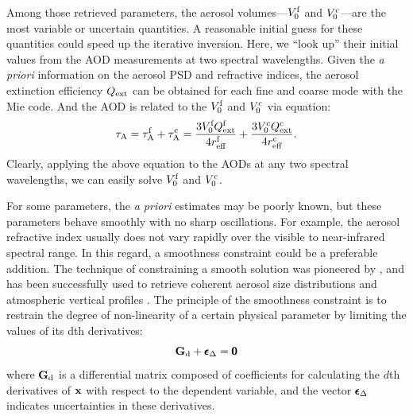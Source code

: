 Among those retrieved parameters, the aerosol volumes---$V_0^\text{f}$ and
$V_0^\text{c}$---are the most variable or uncertain quantities. A reasonable
initial guess for these quantities could speed up the iterative
inversion. Here, we “look up” their initial values from the AOD
measurements at two spectral wavelengths. Given the \textit{a priori}
 information on the aerosol PSD and refractive indices, the aerosol 
extinction efficiency $Q_\text{ext}$ can be obtained for each fine and coarse 
mode with the Mie code. And the AOD is related to the $V_0^\text{f}$ and
$V_0^\text{c}$ via equation:
\begin{equation}
\tau_\text{A} = \tau_\text{A}^\text{f} + \tau_\text{A}^\text{c} 
      = \frac{3V_0^\text{f}Q_\text{ext}^\text{f}}{4r_\text{eff}^\text{f}} +
        \frac{3V_0^\text{c}Q_\text{ext}^\text{c}}{4r_\text{eff}^\text{c}}. 
\end{equation}
Clearly, applying the above equation to the AODs at any two spectral
wavelengths, we can easily solve $V_0^\text{f}$ and $V_0^\text{c}$.

For some parameters, the \textit{a priori} estimates may be poorly known, 
but these parameters behave smoothly with no sharp oscillations. For
example, the aerosol refractive index usually does not vary rapidly over
the visible to near-infrared spectral range. In this regard, a
smoothness constraint could be a preferable addition. The technique of
constraining a smooth solution was pioneered by \citet{Phillips62,
Twomey63}, and has been successfully used to retrieve coherent
aerosol size distributions \citep{Dubovik00a} and atmospheric
vertical profiles \citep{Twomey77}. The principle of the smoothness
constraint is to restrain the degree of non-linearity of a certain
physical parameter by limiting the values of its dth derivatives:
\begin{equation}
\mathbf{G}_\text{d}+\pmb{\epsilon}_\Delta=\pmb{0} \label{eq:smooth}
\end{equation}
where $\mathbf{G}_\text{d}$ is a differential matrix composed of coefficients for
calculating the $d$th derivatives of $\mathbf{x}$ with respect to the dependent
variable, and the vector $\pmb{\epsilon}_\Delta$ indicates uncertainties in these
derivatives. 

